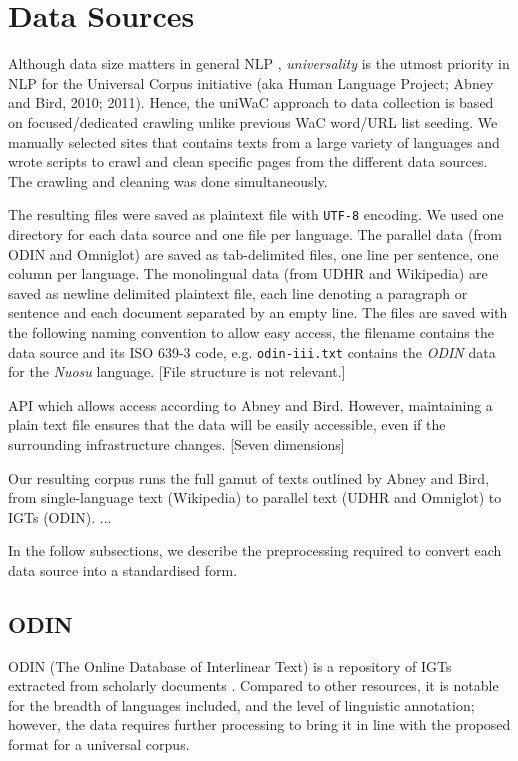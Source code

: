 \documentclass[11pt]{article}
\begin{document}
\section{Data Sources}

Although data size matters in general NLP \cite{banko2001scaling}, \emph{universality} is the utmost priority in NLP for the Universal Corpus initiative (aka Human Language Project; Abney and Bird, 2010; 2011). Hence, the uniWaC approach to data collection is based on focused/dedicated crawling unlike previous WaC word/URL list seeding. We manually selected sites that contains texts from a large variety of languages and wrote scripts to crawl and clean specific pages from the different data sources. The crawling and cleaning was done simultaneously. 

The resulting files were saved as plaintext file with \texttt{UTF-8} encoding. We used one directory for each data source and one file per language. The parallel data (from ODIN and Omniglot) are saved as tab-delimited files, one line per sentence, one column per language. The monolingual data (from UDHR and Wikipedia) are saved as newline delimited plaintext file, each line denoting a paragraph or sentence and each document separated by an empty line. The files are saved with the following naming convention to allow easy access, the filename contains the data source and its ISO 639-3 code, e.g. \texttt{odin-iii.txt} contains the \emph{ODIN} data for the \emph{Nuosu} language. [File structure is not relevant.]

API which allows access according to Abney and Bird.  However, maintaining a plain text file ensures that the data will be easily accessible, even if the surrounding infrastructure changes. [Seven dimensions]

Our resulting corpus runs the full gamut of texts outlined by Abney and Bird, from single-language text (Wikipedia) to parallel text (UDHR and Omniglot) to IGTs (ODIN). ...

In the follow subsections, we describe the preprocessing required to convert each data source into a standardised form.

\subsection{ODIN}

ODIN (The Online Database of Interlinear Text) is a repository of IGTs extracted from scholarly documents \cite{lewis2006odin,lewis2010odin}.  Compared to other resources, it is notable for the breadth of languages included, and the level of linguistic annotation; however, the data requires further processing to bring it in line with the proposed format for a universal corpus.
\end{document}
